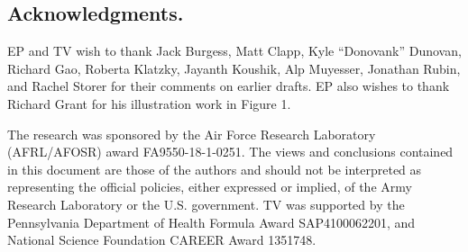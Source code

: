 \documentclass[fleqn,10pt]{wlscirep}
\begin{document}

\subsection*{Acknowledgments.}
 EP and TV wish to thank Jack Burgess, Matt Clapp, Kyle ``Donovank'' Dunovan, Richard Gao, Roberta Klatzky, Jayanth Koushik, Alp Muyesser, Jonathan Rubin, and Rachel Storer for their comments on earlier drafts. EP also wishes to thank Richard Grant for his illustration work in Figure 1.

The research was sponsored by the Air Force Research Laboratory (AFRL/AFOSR) award FA9550-18-1-0251. The views and conclusions contained in this document are those of the authors and should not be interpreted as representing the official policies, either expressed or implied, of the Army Research Laboratory or the U.S. government. TV was supported by the Pennsylvania Department of Health Formula Award SAP4100062201, and National Science Foundation CAREER Award 1351748.





 
\end{document}
